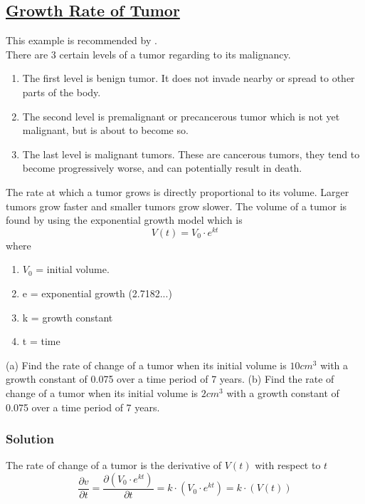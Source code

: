 \subsection{\href{https://www.slideshare.net/ichazalia/derivative-application-in-medical-and-biology}{Growth Rate of Tumor}}

\begin{flushleft}
This example is recommended by \cite{azalia}.\\
There are 3 certain levels of a tumor regarding to its malignancy.
\begin{enumerate}
    \item The first level is benign tumor. It does not invade nearby or spread to other parts of the body.
    \item The second level is premalignant or precancerous tumor which is not yet malignant, but is about to become so.
    \item The last level is malignant tumors. These are cancerous tumors, they tend to become progressively worse, and can potentially result in death.
\end{enumerate}

The rate at which a tumor grows is directly proportional to its volume. Larger tumors grow faster and smaller tumors grow slower.
The volume of a tumor is found by using the exponential growth model which is
	$$
		V(t) = V_0 \cdot e^{kt}
	$$
	where
	
\begin{enumerate}
    \item $V_0$ = initial volume.
    \item e     = exponential growth (2.7182...)
    \item k     = growth constant
    \item t     = time
\end{enumerate}

(a) Find the rate of change of a tumor when its initial volume is $10cm^3$ with a growth constant of 0.075 over a time period of 7 years.\bigbreak
(b) Find the rate of change of a tumor when its initial volume is $2cm^3$ with a growth constant of 0.075 over a time period of 7 years.
\end{flushleft}

\subsubsection{Solution}

The rate of change of a tumor is the derivative of $V(t)$ with respect to $t$
$$
	\frac{\partial v}{\partial t}=\frac{\partial (V_0 \cdot e^{kt})}{\partial t} = k \cdot (V_0 \cdot e^{kt}) = k \cdot (V(t))
$$

